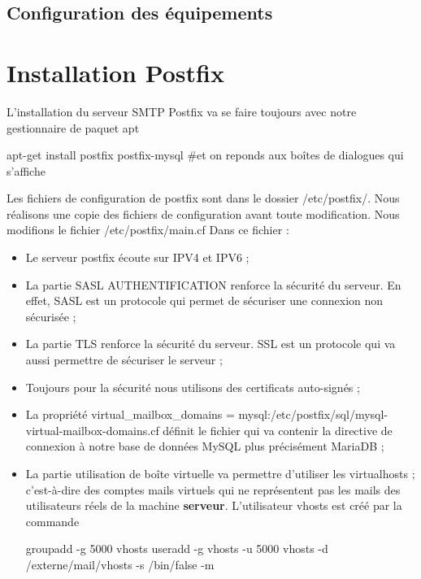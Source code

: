\documentclass[a4paper,12pt,french]{report} %
\begin{document}
\subsection{Configuration des équipements}

\section{Installation Postfix}
L'installation du serveur SMTP Postfix va se faire toujours avec notre gestionnaire de paquet apt
\begin{exempleConsole}
apt-get install postfix  postfix-mysql #et on reponds aux boîtes de dialogues qui s'affiche
\end{exempleConsole}

Les fichiers de configuration de postfix sont dans le dossier /etc/postfix/.
Nous réalisons une copie des fichiers de configuration avant toute modification.
Nous modifions le fichier /etc/postfix/main.cf
\fussy
{}
\nocesure
Dans ce fichier :
\begin{itemize}
	\item Le serveur postfix écoute sur IPV4 et IPV6 ;
	\item La partie SASL AUTHENTIFICATION renforce la sécurité du serveur. En effet, SASL est un protocole qui permet de sécuriser une connexion non sécurisée ;
	\item La partie TLS renforce la sécurité du serveur. SSL est un protocole qui va aussi permettre de sécuriser le serveur ;
	\item Toujours pour la sécurité nous utilisons des certificats auto-signés ; 
	\item La propriété virtual\_mailbox\_domains = mysql:/etc/postfix/sql/mysql-virtual-mailbox-domains.cf définit le fichier qui va contenir la directive de connexion à notre base de données MySQL plus précisément MariaDB ;
	\item La partie utilisation de boîte virtuelle va permettre d'utiliser les virtualhosts ; c'est-à-dire des comptes mails virtuels qui ne représentent pas les mails des utilisateurs réels de la machine \textbf{serveur}. L'utilisateur vhosts est créé par la commande
	\begin{exempleConsole}
	groupadd -g 5000 vhosts 
	useradd -g vhosts -u 5000 vhosts -d /externe/mail/vhosts -s /bin/false -m
	\end{exempleConsole}
\end{itemize}
\end{document}
